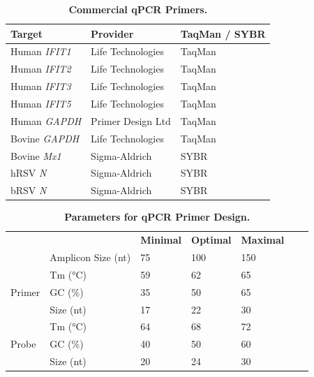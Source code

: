 \begin{table}
\centering
\begin{tabular}{lll}
\toprule
\textbf{Target} & \textbf{Provider} & \textbf{TaqMan / SYBR} \\ \midrule
Human \textit{IFIT1}     & Life Technologies & TaqMan                 \\ 
Human \textit{IFIT2}     & Life Technologies & TaqMan                 \\ 
Human \textit{IFIT3}     & Life Technologies & TaqMan                 \\ 
Human \textit{IFIT5}     & Life Technologies & TaqMan                 \\ 
Human \textit{GAPDH}     & Primer Design Ltd & TaqMan                 \\ 
Bovine \textit{GAPDH}    & Life Technologies & TaqMan                 \\ 
Bovine \textit{Mx1}      & Sigma-Aldrich     & SYBR                   \\ 
hRSV \textit{N}          & Sigma-Aldrich     & SYBR                   \\ 
bRSV \textit{N}          & Sigma-Aldrich     & SYBR                   \\ \bottomrule
\end{tabular}
\caption[Commercial qPCR Primers.]{\textbf{Commercial qPCR Primers.}}
\label{tab:Commercial qPCR Primers Table}
\end{table}

\begin{table}
\centering
\begin{tabular}{lllllll}
                        &                    & \textbf{Minimal} & \textbf{Optimal} & \textbf{Maximal} &  &  \\ \cmidrule{3-5}
                        & Amplicon Size (nt) & 75               & 100              & 150              &  &  \\ \cmidrule{1-5}
\multirow{3}{*}{Primer} & Tm (°C)            & 59               & 62               & 65               &  &  \\ \cmidrule{2-5}
                        & GC (\%)            & 35               & 50               & 65               &  &  \\ \cmidrule{2-5}
                        & Size (nt)          & 17               & 22               & 30               &  &  \\ \cmidrule{1-5}
\multirow{3}{*}{Probe}  & Tm (°C)            & 64               & 68               & 72               &  &  \\ \cmidrule{2-5}
                        & GC (\%)            & 40               & 50               & 60               &  &  \\ \cmidrule{2-5}
                        & Size (nt)          & 20               & 24               & 30               &  &  \\ \cmidrule{1-5}
\end{tabular}
\caption[Parameters for qPCR Primer Design.]{\textbf{Parameters for qPCR Primer Design.}}
\label{tab:Parameters for qPCR Primer Design table}
\end{table}


